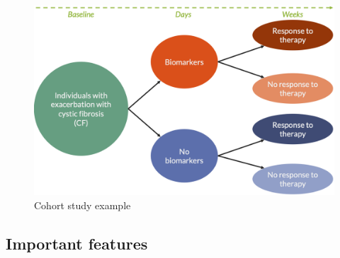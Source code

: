 \documentclass[
]{book}
\begin{document}
\begin{figure}

{\centering \includegraphics[width=1\linewidth]{img/study_design/cohort_study_example} 

}

\caption{Cohort study example}\label{fig:unnamed-chunk-10}
\end{figure}

\hypertarget{important-features}{%
\subsection{Important features}\label{important-features}}
\end{document}
